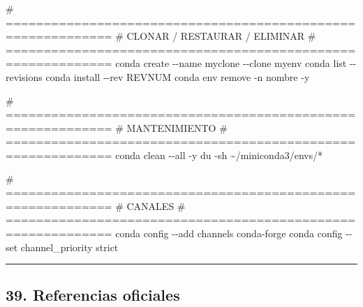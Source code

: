 \documentclass[
  doc,
  floatsintext,
  longtable,
  a4paper,
  nolmodern,
  notxfonts,
  notimes,
  12pt,
  colorlinks=true,linkcolor=blue,citecolor=blue,urlcolor=blue]{apa7}
\newenvironment{Shaded}{\begin{snugshade}}{\end{snugshade}}
\newcommand{\AttributeTok}[1]{\textcolor[rgb]{0.40,0.45,0.13}{#1}}
\newcommand{\CommentTok}[1]{\textcolor[rgb]{0.37,0.37,0.37}{#1}}
\newcommand{\ExtensionTok}[1]{\textcolor[rgb]{0.00,0.23,0.31}{#1}}
\newcommand{\FunctionTok}[1]{\textcolor[rgb]{0.28,0.35,0.67}{#1}}
\newcommand{\NormalTok}[1]{\textcolor[rgb]{0.00,0.23,0.31}{#1}}
\newcommand{\PreprocessorTok}[1]{\textcolor[rgb]{0.68,0.00,0.00}{#1}}
\begin{document}
\begin{Shaded}
\begin{Highlighting}[]
\CommentTok{\# ============================================================}
\CommentTok{\# CLONAR / RESTAURAR / ELIMINAR}
\CommentTok{\# ============================================================}
\ExtensionTok{conda}\NormalTok{ create }\AttributeTok{{-}{-}name}\NormalTok{ myclone }\AttributeTok{{-}{-}clone}\NormalTok{ myenv}
\ExtensionTok{conda}\NormalTok{ list }\AttributeTok{{-}{-}revisions}
\ExtensionTok{conda}\NormalTok{ install }\AttributeTok{{-}{-}rev}\NormalTok{ REVNUM}
\ExtensionTok{conda}\NormalTok{ env remove }\AttributeTok{{-}n}\NormalTok{ nombre }\AttributeTok{{-}y}

\CommentTok{\# ============================================================}
\CommentTok{\# MANTENIMIENTO}
\CommentTok{\# ============================================================}
\ExtensionTok{conda}\NormalTok{ clean }\AttributeTok{{-}{-}all} \AttributeTok{{-}y}
\FunctionTok{du} \AttributeTok{{-}sh}\NormalTok{ \textasciitilde{}/miniconda3/envs/}\PreprocessorTok{*}

\CommentTok{\# ============================================================}
\CommentTok{\# CANALES}
\CommentTok{\# ============================================================}
\ExtensionTok{conda}\NormalTok{ config }\AttributeTok{{-}{-}add}\NormalTok{ channels conda{-}forge}
\ExtensionTok{conda}\NormalTok{ config }\AttributeTok{{-}{-}set}\NormalTok{ channel\_priority strict}
\end{Highlighting}
\end{Shaded}

\begin{center}\rule{0.5\linewidth}{0.5pt}\end{center}

\subsection{39. Referencias oficiales}\label{referencias-oficiales}
\end{document}
